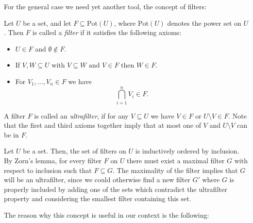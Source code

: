 For the general case we need yet another tool, the concept of filters:

\begin{defn}
Let $U$ be a set, and let $F \subseteq \text{Pot}(U)$, where $\text{Pot}(U)$ denotes the power set on $U$. Then $F$ is called a \emph{filter} if it satisfies the following axioms: 
\begin{itemize}
\item  $U \in F$ and $\emptyset \notin F$.
\item If $V,W \subseteq U$ with $V \subseteq W \text{ and }V  \in F $ then $W \in F$.
\item For $V_1, \ldots, V_n \in F$ we have \[ \bigcap_{i = 1}^n V_i \in F. \]
\end{itemize}
A filter $F$ is called an \emph{ultrafilter}, if for any $V \subseteq U$ we have $V \in F$ or $U \setminus V \in F$. Note that the first and third axioms together imply that at most one of $V$ and $U \setminus V$ can be in $F$.
\end{defn}



\begin{rem}
Let $U$ be a set. Then, the set of filters on $U$ is inductively ordered by inclusion. By Zorn's lemma, for every filter $F$ on $U$ there must exist a maximal filter $G$ with respect to inclusion such that $F \subseteq G$.
The maximality of the filter implies that $G$ will be an ultrafilter, since we could otherwise find a new filter $G'$ where $G$ is properly included by adding one of the sets which contradict the ultrafilter property and considering the smallest filter containing this set.
\end{rem}

The reason why this concept is useful in our context is the following:

